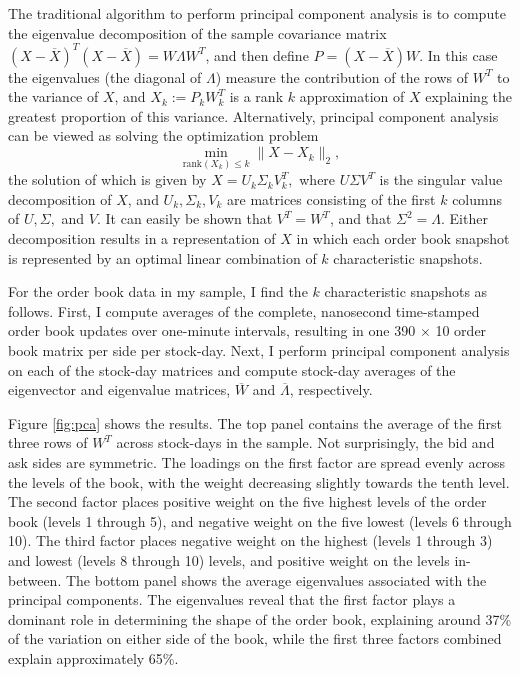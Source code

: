 The traditional algorithm to perform principal component analysis is to compute the eigenvalue decomposition of the sample covariance matrix $(X - \overline{X})^T(X - \overline{X}) = W \Lambda W^T$, and then define $P = (X - \overline{X})W$. In this case the eigenvalues (the diagonal of $\Lambda$) measure the contribution of the rows of $W^T$ to the variance of $X$, and $X_k := P_k W_k^T$ is a rank $k$ approximation of $X$ explaining the greatest proportion of this variance. Alternatively, principal component analysis can be viewed as solving the optimization problem $$ \min_{\text{rank}(X_k) \le k} \| X - X_k \|_2,$$ the solution of which is given by $X = U_k \Sigma_k V_k^T, $ where $U \Sigma V^T$ is the singular value decomposition of $X$, and $U_k, \Sigma_k, V_k$ are matrices consisting of the first $k$ columns of $U, \Sigma,$ and $V$. It can easily be shown that $V^T = W^T$, and that $\Sigma^2 = \Lambda$. Either decomposition results in a representation of $X$ in which each order book snapshot is represented by an optimal linear combination of $k$ characteristic snapshots.

For the order book data in my sample, I find the $k$ characteristic snapshots as follows. First, I compute averages of the complete, nanosecond time-stamped order book updates over one-minute intervals, resulting in one 390 $\times$ 10 order book matrix per side per stock-day. Next, I perform principal component analysis on each of the stock-day matrices and compute stock-day averages of the eigenvector and eigenvalue matrices, $\overline{W}$ and $\overline{\Lambda}$, respectively.

Figure \ref{fig:pca} shows the results. The top panel contains the average of the first three rows of $W^T$ across stock-days in the sample. Not surprisingly, the bid and ask sides are symmetric. The loadings on the first factor are spread evenly across the levels of the book, with the weight decreasing slightly towards the tenth level. The second factor places positive weight on the five highest levels of the order book (levels 1 through 5), and negative weight on the five lowest (levels 6 through 10). The third factor places negative weight on the highest (levels 1 through 3) and lowest (levels 8 through 10) levels, and positive weight on the levels in-between. The bottom panel shows the average eigenvalues associated with the principal components. The eigenvalues reveal that the first factor plays a dominant role in determining the shape of the order book, explaining around 37\% of the variation on either side of the book, while the first three factors combined explain approximately 65\%.

